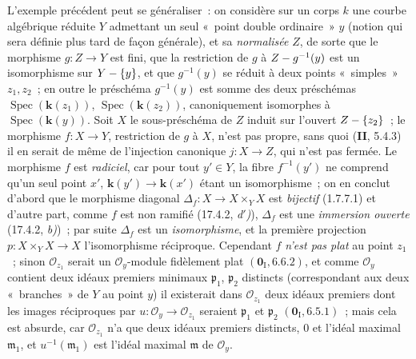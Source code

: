 \begin{env}[11.7.3]
\label{IV.11.7.3-fr}
L'exemple précédent peut se généraliser~: on considère sur un corps $k$ une
courbe algébrique réduite $Y$ admettant un seul «~point double ordinaire~» $y$
(notion qui sera définie plus tard de façon générale), et sa \emph{normalisée} $Z$, de
sorte que le morphisme $g:Z\to Y$ est fini, que la restriction de $g$ à
$Z- g^{-1}(y)$ est un isomorphisme sur $Y-\{y\}$, et que $g^{-1}(y)$ se réduit à
deux points «~simples~» $z_1,z_2$~; en outre le préschéma $g^{-1}(y)$ est somme
des deux préschémas $\operatorname{Spec}(\boldsymbol{k}(z_1))$,
$\operatorname{Spec}(\boldsymbol{k}(z_2))$, canoniquement isomorphes à
$\operatorname{Spec}(\boldsymbol{k}(y))$. Soit $X$ le sous-préschéma de $Z$ induit sur
l'ouvert $Z-\{z_2\}$~; le morphisme $f:X\to Y$, restriction de $g$ à $X$, n'est
pas propre, sans quoi (\textbf{II}, 5.4.3) il en serait de même de l'injection
canonique $j:X\to Z$, qui n'est pas fermée. Le morphisme $f$ est \emph{radiciel}, car
pour tout $y'\in Y$, la fibre $f^{-1}(y')$ ne comprend qu'un seul point $x'$,
$\boldsymbol{k}(y')\to\boldsymbol{k}(x')$ étant un isomorphisme~; on en conclut d'abord que le morphisme
diagonal $\Delta_f:X\to X\times_Y X$ est \emph{bijectif} (1.7.7.1) et d'autre part,
comme $f$ est non ramifié (17.4.2, \emph{d$'$)}), $\Delta_f$ est une \emph{immersion ouverte}
(17.4.2, \emph{b)})~; par suite $\Delta_f$ est un \emph{isomorphisme}, et la première
projection $p:X\times_Y X\to X$ l'isomorphisme réciproque. Cependant $f$ \emph{n'est
pas plat} au point $z_1$~; sinon $\mathcal O_{z_1}$ serait un
$\mathcal O_y$-module fidèlement plat $(\mathbf 0_{\mathrm I},6.6.2)$, et comme
$\mathcal O_y$ contient deux idéaux premiers minimaux $\mathfrak p_1$,
$\mathfrak p_2$ distincts (correspondant aux deux «~branches~» de $Y$ au point
$y$) il existerait dans $\mathcal O_{z_1}$ deux idéaux premiers dont les images
réciproques par $u:\mathcal O_y\to\mathcal O_{z_1}$ seraient
$\mathfrak p_1$ et $\mathfrak p_2$ $(\mathbf 0_{\mathrm I},6.5.1)$~; mais cela
est absurde, car $\mathcal O_{z_1}$ n'a que deux idéaux premiers distincts, $0$
et l'idéal maximal $\mathfrak m_1$, et $u^{-1}(\mathfrak m_1)$ est l'idéal
maximal $\mathfrak m$ de $\mathcal O_y$.
\end{env}

